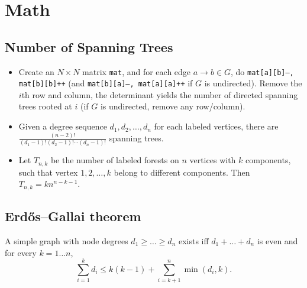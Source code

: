 \section{Math}
	\subsection{Number of Spanning Trees}
	\begin{itemize}
		\item Create an $N\times N$ matrix \texttt{mat}, and for each edge $a \rightarrow b \in G$, do
		\texttt{mat[a][b]--, mat[b][b]++} (and \texttt{mat[b][a]--, mat[a][a]++} if $G$ is undirected).
		Remove the $i$th row and column, the determinant yields the number of directed spanning trees rooted at $i$
		(if $G$ is undirected, remove any row/column).
	  	\item Given a degree sequence $d_1, d_2, \ldots, d_n$ for each labeled vertices, there are $\frac{(n - 2)!}{(d_1 - 1)!(d_2 - 1)!\cdots(d_n - 1)!}$ spanning trees.
	  	\item Let $T_{n, k}$ be the number of labeled forests on $n$ vertices with $k$ components, such that vertex $1, 2, \ldots, k$ belong to different components. Then $T_{n, k} = kn^{n - k - 1}$.
	\end{itemize}

	\subsection{Erdős–Gallai theorem}
		A simple graph with node degrees $d_1 \ge \dots \ge d_n$ exists iff $d_1 + \dots + d_n$ is even and for every $k = 1\dots n$,
		\[ \sum _{i=1}^{k}d_{i}\leq k(k-1)+\sum _{i=k+1}^{n}\min(d_{i},k). \]
